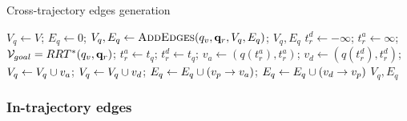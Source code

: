 \documentclass[journal]{IEEEtran}  %
\begin{document}
\begin{algorithm}
\caption{Cross-trajectory edges generation}\label{alg:cross-trajectory-edges}
\begin{algorithmic}
\State $V_{q} \gets V$; $E_{q}\gets 0$;
		\State $V_{q},E_{q} \gets \textsc{AddEdges} (q_{v}, \mathbf{q}_{r}, V_{q}, E_{q}) $;
	\EndFor
\EndFor
\State \Return $V_{q}, E_{q}$
\EndProcedure
{}
\State $t^{d}_r \gets -\infty $; $t^{a}_r \gets \infty$;
\State $\mathcal{V}_{goal}=RRT^*(q_{v}, \mathbf{q}_{r})$;
			\State $t^{a}_r \gets t_{q}$;
		\EndIf
			\State $t^{d}_r \gets t_{q}$;
		\EndIf
        \EndIf
    \EndFor
    \State $v_{a} \gets (q(t^{a}_r),t^{a}_r)$; $v_{d} \gets(q(t^{d}_r), t^{d}_r)$;
    \State $V_{q}\gets V_{q} \cup v_{a}$; $V_{q}\gets V_{q} \cup v_{d}$;
    \State $E_{q}\gets E_{q} \cup (v_{p} \rightarrow v_{a})$; $E_{q}\gets E_{q} \cup (v_{d} \rightarrow v_{p})$
    \EndIf
    \State \Return $V_{q},E_{q}$
    \EndProcedure
   \end{algorithmic}
\end{algorithm}

\subsubsection{In-trajectory edges}\label{sec:Graph-intro}
\end{document}
